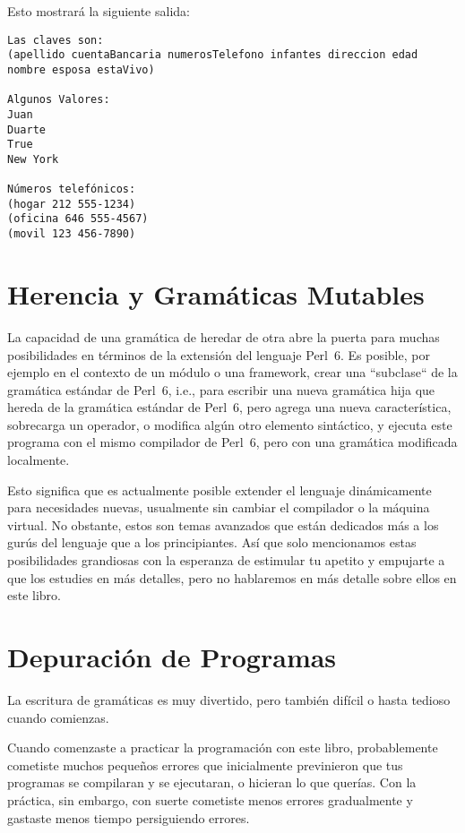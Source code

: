 Esto mostrará la siguiente salida:

\begin{lstlisting}
Las claves son:
(apellido cuentaBancaria numerosTelefono infantes direccion edad nombre esposa estaVivo)

Algunos Valores:
Juan
Duarte
True
New York

Números telefónicos:
(hogar 212 555-1234)
(oficina 646 555-4567)
(movil 123 456-7890)
\end{lstlisting}

\section{Herencia y Gramáticas Mutables}

La capacidad de una gramática de heredar de otra abre la
puerta para muchas posibilidades en términos de la extensión
del lenguaje Perl~6. Es posible, por ejemplo en el contexto de
un módulo o una framework, crear una ``subclase`` de la 
gramática estándar de Perl~6, i.e., para escribir una nueva
gramática hija que hereda de la gramática estándar de Perl~6, pero
agrega una nueva característica, sobrecarga un operador, o modifica
algún otro elemento sintáctico, y ejecuta este programa con el 
mismo compilador de Perl~6, pero con una gramática modificada
localmente.

Esto significa que es actualmente posible extender el lenguaje 
dinámicamente para necesidades nuevas, usualmente sin cambiar
el compilador o la máquina virtual. No obstante, estos son temas
avanzados que están dedicados más a los gurús del lenguaje 
que a los principiantes. Así que solo mencionamos estas posibilidades
grandiosas con la esperanza de estimular tu apetito y empujarte a
que los estudies en más detalles, pero no hablaremos en más detalle
sobre ellos en este libro.

\section{Depuración de Programas}

La escritura de gramáticas es muy divertido, pero también difícil
o hasta tedioso cuando comienzas.

Cuando comenzaste a practicar la programación con este libro,
probablemente cometiste muchos pequeños errores que inicialmente
previnieron que tus programas se compilaran y se ejecutaran, o
hicieran lo que querías. Con la práctica, sin embargo, con suerte
cometiste menos errores gradualmente y gastaste menos tiempo 
persiguiendo errores.


